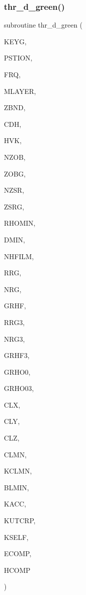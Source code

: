 \subsubsection{\texorpdfstring{thr\+\_\+d\+\_\+green()}{thr\_d\_green()}}
{\footnotesize\ttfamily subroutine thr\+\_\+d\+\_\+green (\begin{DoxyParamCaption}\item[{integer}]{K\+E\+YG,  }\item[{real, dimension(6)}]{P\+S\+T\+I\+ON,  }\item[{real}]{F\+RQ,  }\item[{integer}]{M\+L\+A\+Y\+ER,  }\item[{real, dimension(0\+:mlayer)}]{Z\+B\+ND,  }\item[{complex, dimension(0\+:mlayer)}]{C\+DH,  }\item[{real, dimension(0\+:mlayer)}]{H\+VK,  }\item[{integer}]{N\+Z\+OB,  }\item[{real, dimension(nzob)}]{Z\+O\+BG,  }\item[{integer}]{N\+Z\+SR,  }\item[{real, dimension(2,nzsr)}]{Z\+S\+RG,  }\item[{real}]{R\+H\+O\+M\+IN,  }\item[{real}]{D\+M\+IN,  }\item[{integer}]{N\+H\+F\+I\+LM,  }\item[{real, dimension(nrg)}]{R\+RG,  }\item[{integer}]{N\+RG,  }\item[{complex, dimension(11,nhfilm,nzsr,nzob)}]{G\+R\+HF,  }\item[{real, dimension(nrg3)}]{R\+R\+G3,  }\item[{integer}]{N\+R\+G3,  }\item[{complex, dimension(11,nhfilm,nzsr)}]{G\+R\+H\+F3,  }\item[{complex, dimension(4,nzsr,nzob)}]{G\+R\+H\+O0,  }\item[{complex, dimension(4,nzsr)}]{G\+R\+H\+O03,  }\item[{real}]{C\+LX,  }\item[{real}]{C\+LY,  }\item[{real}]{C\+LZ,  }\item[{real}]{C\+L\+MN,  }\item[{integer}]{K\+C\+L\+MN,  }\item[{real}]{B\+L\+M\+IN,  }\item[{integer}]{K\+A\+CC,  }\item[{integer}]{K\+U\+T\+C\+RP,  }\item[{integer}]{K\+S\+E\+LF,  }\item[{complex, dimension(9)}]{E\+C\+O\+MP,  }\item[{complex, dimension(9)}]{H\+C\+O\+MP }\end{DoxyParamCaption})}

